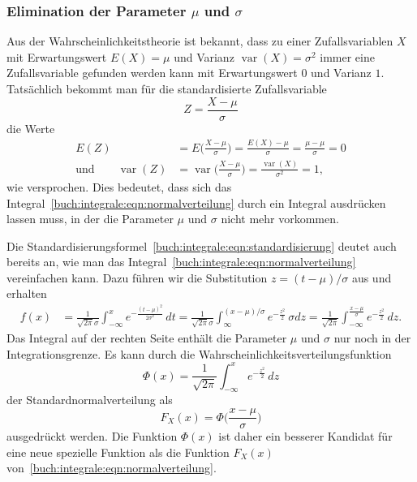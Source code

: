 \subsubsection{Elimination der Parameter $\mu$ und $\sigma$}
Aus der Wahrscheinlichkeitstheorie ist bekannt, dass zu einer
Zufallsvariablen $X$ mit Erwartungswert $E(X)=\mu$ und Varianz
$\operatorname{var}(X)=\sigma^2$ immer eine Zufallsvariable
gefunden werden kann mit Erwartungswert $0$ und Varianz $1$.
Tatsächlich bekommt man für die standardisierte Zufallsvariable
\begin{equation}
Z = \frac{X-\mu}{\sigma}
\label{buch:integrale:eqn:standardisierung}
\end{equation}
die Werte
\begin{align*}
E(Z)
&=
E\biggl(\frac{X-\mu}{\sigma}\biggr)
=
\frac{E(X)-\mu}{\sigma}
=
\frac{\mu-\mu}{\sigma}
=
0
\\
\text{und}\qquad
\operatorname{var}(Z)
&=
\operatorname{var}\biggl(\frac{X-\mu}{\sigma}\biggr)
=
\frac{\operatorname{var}(X)}{\sigma^2}
=
1,
\end{align*}
wie versprochen.
Dies bedeutet, dass sich das
Integral~\eqref{buch:integrale:eqn:normalverteilung}
durch ein Integral ausdrücken lassen muss, in der die Parameter $\mu$
und $\sigma$ nicht mehr vorkommen.

Die Standardisierungsformel~\eqref{buch:integrale:eqn:standardisierung}
deutet auch bereits an, wie man das
Integral~\eqref{buch:integrale:eqn:normalverteilung} vereinfachen kann.
Dazu führen wir die Substitution $z=(t-\mu)/\sigma$ aus und erhalten
\begin{align*}
f(x)
&=
\frac{1}{\sqrt{2\pi}\sigma} 
\int_{-\infty}^x e^{-\frac{(t-\mu)^2}{2\sigma^2}}\,dt
=
\frac{1}{\sqrt{2\pi}\sigma}
\int_{\infty}^{(x-\mu)/\sigma}
e^{-\frac{z^2}2}\,\sigma dz
=
\frac{1}{\sqrt{2\pi}}
\int_{-\infty}^{\frac{x-\mu}{\sigma}} e^{-\frac{z^2}2}\,dz.
\end{align*}
Das Integral auf der rechten Seite enthält die Parameter $\mu$ und
$\sigma$ nur noch in der Integrationsgrenze.
Es kann durch die Wahrscheinlichkeitsverteilungsfunktion
\begin{equation}
\Phi(x) = \frac{1}{\sqrt{2\pi}} \int_{-\infty}^x e^{-\frac{z^2}2}\,dz
\label{buch:integrale:eqn:standardnormalverteilung}
\end{equation}
der Standardnormalverteilung als
\[
F_X(x) = \Phi\biggl(\frac{x-\mu}{\sigma}\biggr)
\]
ausgedrückt werden.
Die Funktion $\Phi(x)$ ist daher ein besserer Kandidat für eine
neue spezielle Funktion als die Funktion $F_X(x)$
von~\eqref{buch:integrale:eqn:normalverteilung}.


